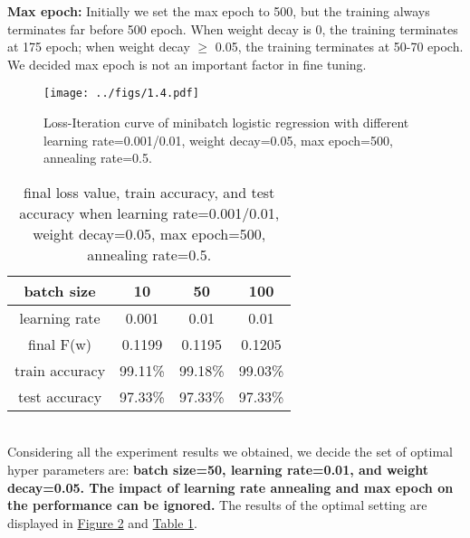 \documentclass{article}
\begin{document}
        \textbf{Max epoch:} Initially we set the max epoch to 500, but the training always terminates far before 500 epoch.
        When weight decay is 0, the training terminates at 175 epoch; when weight decay $\geq$ 0.05, the training terminates at 50-70 epoch.
        We decided max epoch is not an important factor in fine tuning.\\
        \vspace{-20pt}
        \begin{figure}[hbt!]
            \centering
            \texttt{[image: ../figs/1.4.pdf]}
            \caption{Loss-Iteration curve of minibatch logistic regression with different learning rate=0.001/0.01,
            weight decay=0.05, max epoch=500, annealing rate=0.5.}
            \label{fig:1.4}
        \end{figure}
        \begin{table}[hbt!]
            \centering
            \begin{tabular}{|c||c|c|c|}
                \hline
                batch size&10&50&100\\
                \hline
                learning rate&0.001&0.01&0.01\\
                \hline
                final F(w)&0.1199&0.1195&0.1205\\
                \hline
                train accuracy&99.11\%&99.18\%&99.03\%\\
                \hline
                test accuracy&97.33\%&97.33\%&97.33\%\\
                \hline
            \end{tabular}
            \caption{final loss value, train accuracy, and test accuracy when learning rate=0.001/0.01,
            weight decay=0.05, max epoch=500, annealing rate=0.5.}
            \label{tab:1.4}
        \end{table}\\
        Considering all the experiment results we obtained, we decide the set of optimal hyper parameters are:
        \textbf{batch size=50, learning rate=0.01, and weight decay=0.05. The impact of learning rate annealing and max epoch on the performance can be ignored.}
        The results of the optimal setting are displayed in \hyperref[fig:1.4]{Figure 2} and \hyperref[tab:1.4]{Table 1}.
\end{document}
